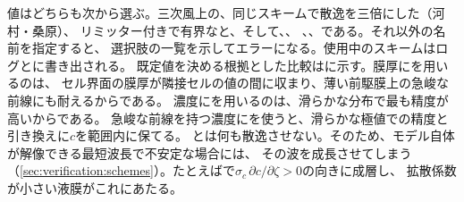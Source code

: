 値はどちらも次から選ぶ。三次風上の、同じスキームで散逸を三倍にした（河村・桑原）、
リミッター付きで有界なと、そして、、
、、である。それ以外の名前を指定すると、
選択肢の一覧を示してエラーになる。使用中のスキームはログとに書き出される。
既定値を決める根拠とした比較はに示す。膜厚にを用いるのは、
セル界面の膜厚が隣接セルの値の間に収まり、薄い前駆膜上の急峻な前線にも耐えるからである。
濃度にを用いるのは、滑らかな分布で最も精度が高いからである。
急峻な前線を持つ濃度にを使うと、滑らかな極値での精度と引き換えに$c$を範囲内に保てる。
とは何も散逸させない。そのため、モデル自体が解像できる最短波長で不安定な場合には、
その波を成長させてしまう（\cref{sec:verification:schemes}）。たとえばで$\sigma_c\,\partial c/\partial\zeta > 0$の向きに成層し、
拡散係数が小さい液膜がこれにあたる。

